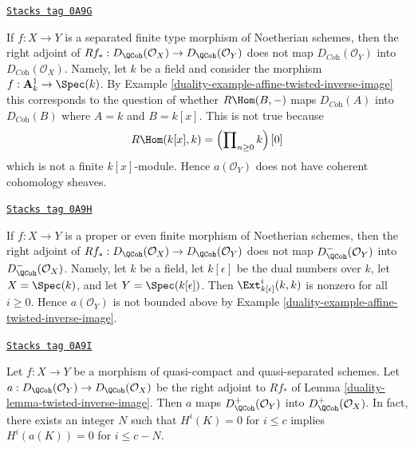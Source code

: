 \begin{example}
\label{duality-example-does-not-preserve-coherent}
\href{https://stacks.math.columbia.edu/tag/0A9G}{\texttt{Stacks tag 0A9G}}

If $f : X \to Y$ is a separated finite type morphism of Noetherian schemes,
then the right adjoint of
$Rf_* : D_\QCoh(\mathcal{O}_X) \to D_\QCoh(\mathcal{O}_Y)$ does not map
$D_{\textit{Coh}}(\mathcal{O}_Y)$ into
$D_{\textit{Coh}}(\mathcal{O}_X)$. Namely, let $k$ be a field and
consider the morphism $f : \mathbf{A}^1_k \to \Spec(k)$. By
Example \ref{duality-example-affine-twisted-inverse-image}
this corresponds to the question of whether
$R\Hom(B, -)$ maps $D_{\textit{Coh}}(A)$ into $D_{\textit{Coh}}(B)$
where $A = k$ and $B = k[x]$. This is not true because
$$
R\Hom(k[x], k) = \left(\prod\nolimits_{n \geq 0} k\right)[0]
$$
which is not a finite $k[x]$-module. Hence $a(\mathcal{O}_Y)$
does not have coherent cohomology sheaves.
\end{example}

\begin{example}
\label{duality-example-does-not-preserve-bounded-above}
\href{https://stacks.math.columbia.edu/tag/0A9H}{\texttt{Stacks tag 0A9H}}

If $f : X \to Y$ is a proper or even finite morphism of Noetherian schemes,
then the right adjoint of
$Rf_* : D_\QCoh(\mathcal{O}_X) \to D_\QCoh(\mathcal{O}_Y)$
does not map $D_\QCoh^-(\mathcal{O}_Y)$ into
$D_\QCoh^-(\mathcal{O}_X)$. Namely, let $k$ be a field, let
$k[\epsilon]$ be the dual numbers over $k$, let
$X = \Spec(k)$, and let $Y = \Spec(k[\epsilon])$.
Then $\Ext^i_{k[\epsilon]}(k, k)$ is nonzero for all $i \geq 0$.
Hence $a(\mathcal{O}_Y)$ is not bounded above
by Example \ref{duality-example-affine-twisted-inverse-image}.
\end{example}

\begin{lemma}
\label{duality-lemma-twisted-inverse-image-bounded-below}
\href{https://stacks.math.columbia.edu/tag/0A9I}{\texttt{Stacks tag 0A9I}}

Let $f : X \to Y$ be a morphism of quasi-compact and quasi-separated
schemes. Let $a : D_\QCoh(\mathcal{O}_Y) \to D_\QCoh(\mathcal{O}_X)$
be the right adjoint to $Rf_*$ of Lemma \ref{duality-lemma-twisted-inverse-image}.
Then $a$ maps $D^+_\QCoh(\mathcal{O}_Y)$ into $D^+_\QCoh(\mathcal{O}_X)$.
In fact, there exists an integer $N$ such that
$H^i(K) = 0$ for $i \leq c$ implies $H^i(a(K)) = 0$ for $i \leq c - N$.
\end{lemma}

